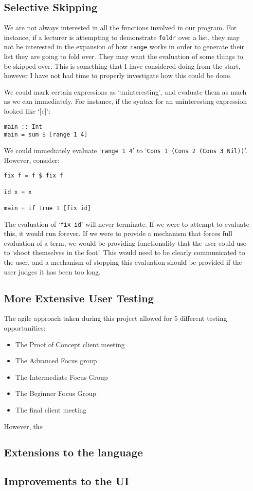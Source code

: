 \subsection{Selective Skipping}
\label{fw:function_checkboxes}
We are not always interested in all the functions involved in our program. For instance, if a lecturer is attempting to demonstrate \verb|foldr| over a list, they may not be interested in the expansion of how \verb|range| works in order to generate their list they are going to fold over. They may want the evaluation of some things to be skipped over. This is something that I have considered doing from the start, however I have not had time to properly investigate how this could be done. 

We could mark certain expressions as `uninteresting', and evaluate them as much as we can immediately. For instance, if the syntax for an uninteresting expression looked like `[e]':

\begin{lstlisting}[language=SFL]
main :: Int 
main = sum $ [range 1 4]
\end{lstlisting}

\noindent We could immediately evaluate `\lstinline[language=SFL]|range 1 4|' to `\lstinline[language=SFL]|Cons 1 (Cons 2 (Cons 3 Nil))|'. However, consider:

\begin{lstlisting}[language=SFL]
fix f = f $ fix f

id x = x

main = if true 1 [fix id]
\end{lstlisting}

The evaluation of `\lstinline[language=SFL]|fix id|' will never terminate. If we were to attempt to evaluate this, it would run forever. If we were to provide a mechanism that forces full evaluation of a term, we would be providing functionality that the user could use to `shoot themselves in the foot'. This would need to be clearly communicated to the user, and a mechanism of stopping this evaluation should be provided if the user judges it has been too long. 

\subsection{More Extensive User Testing}
The agile approach taken during this project allowed for 5 different testing opportunities:
\begin{itemize}
    \item The Proof of Concept client meeting
    \item The Advanced Focus group
    \item The Intermediate Focus Group
    \item The Beginner Focus Group
    \item The final client meeting
\end{itemize}

However, the 

\subsection{Extensions to the language}



\subsection{Improvements to the UI}